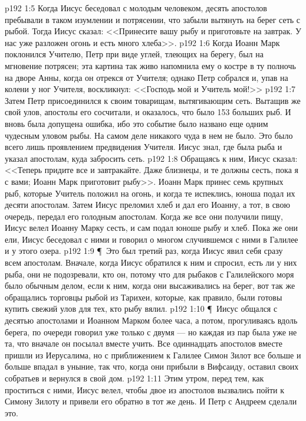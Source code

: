 \vs p192 1:5 Когда Иисус беседовал с молодым человеком, десять апостолов пребывали в таком изумлении и потрясении, что забыли вытянуть на берег сеть с рыбой. Тогда Иисус сказал: <<Принесите вашу рыбу и приготовьте на завтрак. У нас уже разложен огонь и есть много хлеба>>.
\vs p192 1:6 Когда Иоанн Марк поклонился Учителю, Петр при виде углей, тлеющих на берегу, был на мгновение потрясен; эта картина так живо напомнила ему о костре в ту полночь на дворе Анны, когда он отрекся от Учителя; однако Петр собрался и, упав на колени у ног Учителя, воскликнул: <<Господь мой и Учитель мой!>>
\vs p192 1:7 Затем Петр присоединился к своим товарищам, вытягивающим сеть. Вытащив же свой улов, апостолы его сосчитали, и оказалось, что было 153 больших рыб. И вновь была допущена ошибка, ибо это событие было названо еще одним чудесным уловом рыбы. На самом деле никакого чуда в нем не было. Это было всего лишь проявлением предвидения Учителя. Иисус знал, где была рыба и указал апостолам, куда забросить сеть.
\vs p192 1:8 Обращаясь к ним, Иисус сказал: <<Теперь придите все и завтракайте. Даже близнецы, и те должны сесть, пока я с вами; Иоанн Марк приготовит рыбу>>. Иоанн Марк принес семь крупных рыб, которые Учитель положил на огонь, и когда те испеклись, юноша подал их десяти апостолам. Затем Иисус преломил хлеб и дал его Иоанну, а тот, в свою очередь, передал его голодным апостолам. Когда же все они получили пищу, Иисус велел Иоанну Марку сесть, и сам подал юноше рыбу и хлеб. Пока же они ели, Иисус беседовал с ними и говорил о многом случившемся с ними в Галилее и у этого озера.
\vs p192 1:9 \P\ Это был третий раз, когда Иисус явил себя сразу всем апостолам. Вначале, когда Иисус обратился к ним и спросил, есть ли у них рыба, они не подозревали, кто он, потому что для рыбаков с Галилейского моря было обычным делом, если к ним, когда они высаживались на берег, вот так же обращались торговцы рыбой из Тарихеи, которые, как правило, были готовы купить свежий улов для тех, кто рыбу вялил.
\vs p192 1:10 \P\ Иисус общался с десятью апостолами и Иоанном Марком более часа, а потом, прогуливаясь вдоль берега, по очереди говорил уже только с двумя --- но каждая из пар была уже не та, что вначале он посылал вместе учить. Все одиннадцать апостолов вместе пришли из Иерусалима, но с приближением к Галилее Симон Зилот все больше и больше впадал в уныние, так что, когда они прибыли в Вифсаиду, оставил своих собратьев и вернулся в свой дом.
\vs p192 1:11 Этим утром, перед тем, как проститься с ними, Иисус велел, чтобы двое из апостолов вызвались пойти к Симону Зилоту и привели его обратно в тот же день. И Петр с Андреем сделали это.
